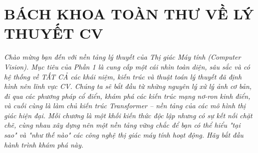 \part{BÁCH KHOA TOÀN THƯ VỀ LÝ THUYẾT CV}

\textit{Chào mừng bạn đến với nền tảng lý thuyết của Thị giác Máy tính (Computer Vision). 
	Mục tiêu của Phần 1 là cung cấp một cái nhìn toàn diện, sâu sắc và có hệ thống về 
	TẤT CẢ các khái niệm, kiến trúc và thuật toán lý thuyết đã định hình nên lĩnh vực CV. 
	Chúng ta sẽ bắt đầu từ những nguyên lý xử lý ảnh cơ bản, đi qua các phương pháp cổ điển, 
	khám phá các kiến trúc mạng nơ-ron kinh điển, và cuối cùng là làm chủ kiến trúc 
	Transformer – nền tảng của các mô hình thị giác hiện đại. 
	Mỗi chương là một khối kiến thức độc lập nhưng có sự kết nối chặt chẽ, 
	cùng nhau xây dựng nên một nền tảng vững chắc để bạn có thể hiểu 
	"tại sao" và "như thế nào" các công nghệ thị giác máy tính hoạt động. 
	Hãy bắt đầu hành trình khám phá này.}
